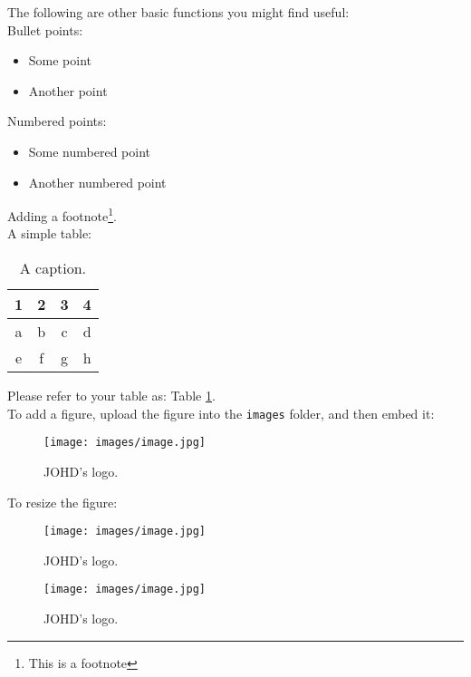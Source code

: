 \documentclass{article}
\begin{document}
\noindent The following are other basic functions you might find useful:\\

\noindent Bullet points:
\begin{itemize}
    \item Some point
    \item Another point
\end{itemize}

\noindent Numbered points:
\begin{itemize}
    \item[1.] Some numbered point 
    \item[2.] Another numbered point
\end{itemize}

\noindent Adding a footnote\footnote{This is a footnote}. \\

\noindent A simple table:

\begin{table}[H]
\centering
\caption{\label{tab1} A caption.} %
\begin{tabular}{cccc}
\hline
1 & 2 & 3 & 4 \\
\hline
a & b & c & d\\
e & f & g & h\\
\hline
\end{tabular}
\end{table}

\noindent Please refer to your table as: Table \ref{tab1}. \\

\noindent To add a figure, upload the figure into the \texttt{images} folder, and then embed it:

\begin{figure}[H]
\centering
\texttt{[image: images/image.jpg]}
\caption{\label{fig1}JOHD's logo.}
\end{figure}

\noindent To resize the figure:

\begin{figure}[H]
\centering
\texttt{[image: images/image.jpg]}
\caption{\label{fig2}JOHD's logo.}
\end{figure}

\begin{figure}[H]
\centering
\texttt{[image: images/image.jpg]}
\caption{\label{fig3}JOHD's logo.}
\end{figure}
\end{document}
